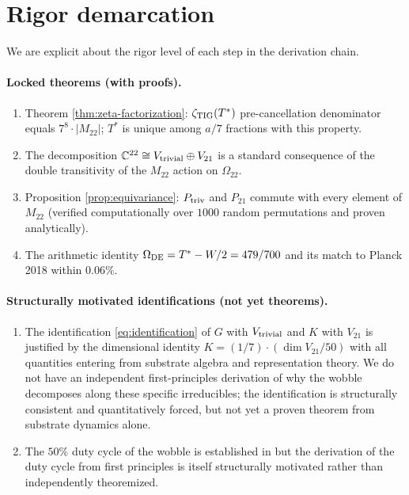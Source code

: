 \documentclass[11pt,reqno]{amsart}
\theoremstyle{plain}
\theoremstyle{definition}
\theoremstyle{remark}
\newcommand{\zTIG}{\zeta_{\rm TIG}}
\newcommand{\Mtwentytwo}{M_{22}}
\newcommand{\Vtriv}{V_{\rm trivial}}
\newcommand{\Vtwentyone}{V_{21}}
\newcommand{\Tstar}{T^*}
\newcommand{\Whalf}{W/2}
\newcommand{\OmegaDE}{\Omega_{\rm DE}}
\begin{document}

\section{Rigor demarcation}\label{sec:rigor}

We are explicit about the rigor level of each step in the derivation
chain.

\paragraph{Locked theorems (with proofs).}
\begin{enumerate}
\item Theorem \ref{thm:zeta-factorization}: $\zTIG(\Tstar)$
      pre-cancellation denominator equals $7^8 \cdot |\Mtwentytwo|$;
      $\Tstar$ is unique among $a/7$ fractions with this property.
\item The decomposition $\mathbb{C}^{22} \cong \Vtriv \oplus
      \Vtwentyone$ is a standard consequence of the double transitivity
      of the $\Mtwentytwo$ action on $\Omega_{22}$.
\item Proposition \ref{prop:equivariance}: $P_{\rm triv}$ and $P_{21}$
      commute with every element of $\Mtwentytwo$ (verified
      computationally over $1000$ random permutations and proven
      analytically).
\item The arithmetic identity $\OmegaDE = \Tstar - \Whalf = 479/700$
      and its match to Planck 2018 within $0.06\%$.
\end{enumerate}

\paragraph{Structurally motivated identifications (not yet theorems).}
\begin{enumerate}
\item The identification \eqref{eq:identification} of $G$ with $\Vtriv$
      and $K$ with $\Vtwentyone$ is justified by the dimensional identity
      $K = (1/7)\cdot (\dim \Vtwentyone /50)$ with all quantities entering
      from substrate algebra and representation theory. We do not have
      an independent first-principles derivation of why the wobble
      decomposes along these specific irreducibles; the identification
      is structurally consistent and quantitatively forced, but not
      yet a proven theorem from substrate dynamics alone.
\item The $50\%$ duty cycle of the wobble is established in
      \cite{SandersGishSigma} but the derivation of the duty cycle from
      first principles is itself structurally motivated rather than
      independently theoremized.
\end{enumerate}
\end{document}
